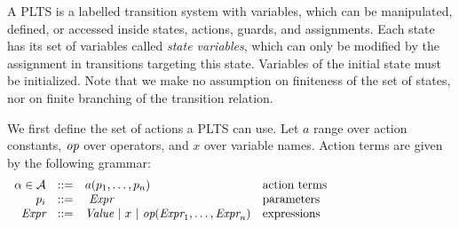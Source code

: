 \documentclass[smallcondensed]{svjour3}
\def\AlgA{\mathcal{A}}
\begin{document}
A PLTS is a labelled transition system with variables, which can be
manipulated, defined, or accessed inside states, actions, guards, and
assignments. 
%
%
Each state has its set of variables called \emph{state variables}, 
which can only be modified by the assignment in transitions targeting this state. Variables of the initial state must be initialized.
%
Note that we make no assumption on finiteness of the set of states, nor
on finite branching of the transition relation.

We first define the set of actions a PLTS can use.  Let $a$
range over action constants, $\symb{op}$ over operators, and $x$  over
variable names. Action terms are given by the following grammar:
\[
\begin{array}[l]{rcl@{\quad}p{5.5cm}}
\alpha\in\AlgA&::=&a(p_1,\ldots,p_n)&\text{action terms}\\
p_i&::=& ~\symb{Expr}&\text{parameters}\\
\symb{Expr}&::=& \symb{Value}~|~x~|~\symb{op}(\symb{Expr}_1,\dots,\symb{Expr}_n)&\text{expressions}
\end{array}
\]
\end{document}
